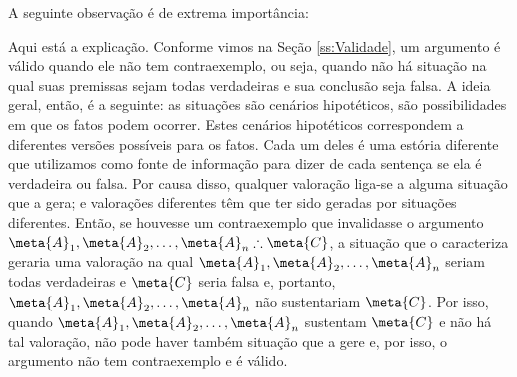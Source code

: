 A seguinte observação é de extrema importância:
	\label{SusVal}

Aqui está a explicação.
Conforme vimos na Seção \ref{ss:Validade}, um argumento é válido quando ele não tem contraexemplo, ou seja, quando não há situação na qual suas premissas sejam todas verdadeiras e sua conclusão seja falsa.
A ideia geral, então, é a seguinte:
as situações são cenários hipotéticos, são possibilidades em que os fatos podem ocorrer.
Estes cenários hipotéticos correspondem a diferentes versões possíveis para os fatos.
Cada um deles é uma estória diferente que utilizamos como fonte de informação para dizer de cada sentença se ela é verdadeira ou falsa.
Por causa disso, qualquer valoração liga-se a alguma situação que a gera; e valorações diferentes têm que ter sido geradas por situações diferentes.
Então, se houvesse um contraexemplo que invalidasse o argumento $\meta{A}_1, \meta{A}_2, \ldots, \meta{A}_n \therefore \meta{C}$, a situação que o caracteriza geraria uma valoração na qual $\meta{A}_1, \meta{A}_2, \ldots, \meta{A}_n$ seriam todas verdadeiras e $\meta{C}$ seria falsa e, portanto, $\meta{A}_1, \meta{A}_2, \ldots, \meta{A}_n$ não sustentariam $\meta{C}$.
Por isso, quando $\meta{A}_1, \meta{A}_2, \ldots, \meta{A}_n$ sustentam $\meta{C}$ e não há tal valoração, não pode haver também situação que a gere e, por isso, o argumento não tem contraexemplo e é válido.


